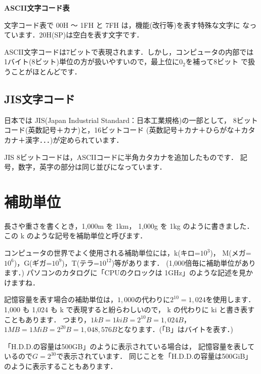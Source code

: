 \begin{center}
{\bf ASCII文字コード表}
\vspace{0.2cm}
\end{center}

文字コード表で 00H 〜 1FH と 7FH は，機能(改行等)を表す特殊な文字に
なっています．20H(SP)は空白を表す文字です．

ASCII文字コードは7ビットで表現されます．しかし，コンピュータの内部では
1バイト(8ビット)単位の方が扱いやすいので，最上位に$0_2$を補って8ビット
で扱うことがほとんどです．

\subsection{JIS文字コード}
日本では JIS(Japan Industrial Standard：日本工業規格)の一部として，
8ビットコード(英数記号＋カナ)と，16ビットコード
(英数記号＋カナ＋ひらがな＋カタカナ＋漢字．．．)が定められています．

JIS 8ビットコードは，ASCIIコードに半角カタカナを追加したものです．
記号，数字，英字の部分は同じ並びになっています．

\section{補助単位}

長さや重さを書くとき，1,000m を 1km， 1,000g を 1kg のように書きました．
この k のような記号を補助単位と呼びます．

コンピュータの世界でよく使用される補助単位には，k(キロ=$10^3$)，
M(メガ=$10^6$)，G(ギガ=$10^9$)，T(テラ=$10^{12}$)等があります．
(1,000倍毎に補助単位があります．)
パソコンのカタログに「CPUのクロックは 1GHz」のような記述を見かけますね．

記憶容量を表す場合の補助単位は，$1,000$の代わりに$2^{10} = 1,024$を使用します．
1,000 も 1,024 も k で表現すると紛らわしいので，
k の代わりに ki と書き表すこともあります．
つまり，$1kB =1kiB = 2^{10}B = 1,024B$，
$1MB =1MiB = 2^{20}B = 1,048,576B$となります．(「B」はバイトを表す．)

「H.D.D.の容量は500GB」のように表示されている場合は，
記憶容量を表しているので$G = 2^{30}$で表示されています．
同じことを「H.D.D.の容量は500GiB」のように表示することもあります．

